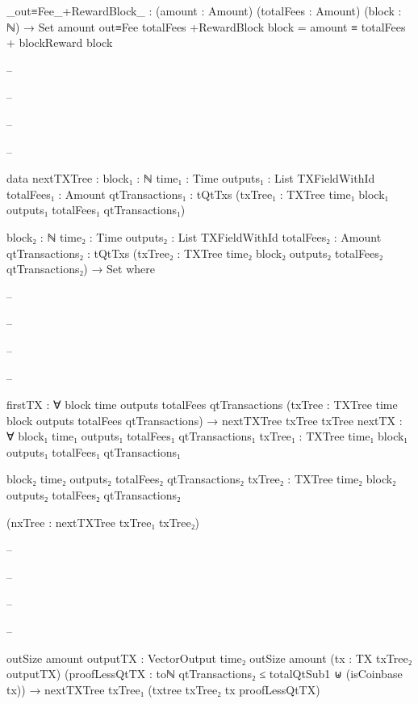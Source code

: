 \documentclass{beamer}
\begin{document}
{\begin{frame}
\begin{code}
        _out≡Fee_+RewardBlock_ : (amount : Amount)
          (totalFees : Amount)
          (block : ℕ) → Set
        amount out≡Fee totalFees +RewardBlock block =
          amount ≡ totalFees + blockReward block

-- \end{code}
-- \end{frame}
-- \begin{frame}
-- \begin{code}


      data nextTXTree :
        {block₁ : ℕ}
        {time₁ : Time}
        {outputs₁ : List TXFieldWithId}
        {totalFees₁ : Amount}
        {qtTransactions₁ : tQtTxs}
        (txTree₁ : TXTree time₁ block₁ outputs₁
          totalFees₁ qtTransactions₁)

        {block₂ : ℕ}
        {time₂ : Time}
        {outputs₂ : List TXFieldWithId}
        {totalFees₂ : Amount}
        {qtTransactions₂ : tQtTxs}
        (txTree₂ : TXTree time₂ block₂ outputs₂
          totalFees₂ qtTransactions₂)
        → Set where

-- \end{code}
-- \end{frame}
-- \begin{frame}
-- \begin{code}

        firstTX : ∀ {block time outputs totalFees qtTransactions}
          (txTree : TXTree time block outputs totalFees qtTransactions)
          → nextTXTree txTree txTree
        nextTX : ∀ {block₁ time₁ outputs₁ totalFees₁ qtTransactions₁}
          {txTree₁ : TXTree time₁ block₁
            outputs₁ totalFees₁ qtTransactions₁}

          {block₂ time₂ outputs₂ totalFees₂ qtTransactions₂}
          {txTree₂ : TXTree time₂ block₂
            outputs₂ totalFees₂ qtTransactions₂}

          (nxTree : nextTXTree txTree₁ txTree₂)

-- \end{code}
-- \end{frame}
-- \begin{frame}
-- \begin{code}

          {outSize amount}
          {outputTX : VectorOutput time₂ outSize amount}
          (tx : TX txTree₂ outputTX)
          (proofLessQtTX :
              toℕ qtTransactions₂ ≤ totalQtSub1
              ⊎
              (isCoinbase tx))
          → nextTXTree txTree₁ (txtree txTree₂ tx proofLessQtTX)


\end{code}
\end{frame}}
\end{document}
